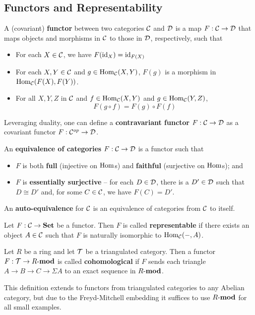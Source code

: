 \documentclass[12pt]{article}
\begin{document}
\subsection{Functors and Representability}
\begin{defn}
  A (covariant) \textbf{functor} between two categories $\mathcal{C}$ and $\mathcal{D}$ is a map $F:\mathcal{C}\to\mathcal{D}$ that maps objects and morphisms in $\mathcal{C}$ to those in $\mathcal{D}$, respectively, such that 
  \begin{itemize}
    \item For each $X\in\mathcal{C}$, we have $F(\operatorname{id}_X)=\operatorname{id}_{F(X)}$
    \item For each $X,Y\in\mathcal{C}$ and $g\in\operatorname{Hom}_{\mathcal{C}}(X,Y)$, $F(g)$ is a morphism in $\operatorname{Hom}_{\mathcal{C}}(F(X),F(Y))$.
    \item For all $X,Y,Z$ in $\mathcal{C}$ and $f\in\operatorname{Hom}_{\mathcal{C}}(X,Y)$ and $g\in\operatorname{Hom}_{\mathcal{C}}(Y,Z)$,
    \[F(g\circ f)=F(g)\circ F(f)\]
  \end{itemize}
\end{defn}
\begin{rmk}
	Leveraging duality, one can define a \textbf{contravariant functor} $F:\mathcal{C}\to \mathcal{D}$ as a covariant functor $F:\mathcal{C}^{op}\to \mathcal{D}$.
\end{rmk}
\begin{defn}
	An \textbf{equivalence of categories} $F:\mathcal{C}\to\mathcal{D}$ is a functor such that 
	\begin{itemize}
		\item $F$ is both \textbf{full} (injective on $\operatorname{Hom}$s) and \textbf{faithful} (surjective on $\operatorname{Hom}$s); and 
		\item $F$ is \textbf{essentially surjective} -- for each $D\in\mathcal{D}$, there is a $D'\in\mathcal{D}$ such that 
		$D\cong D'$ and, for some $C\in\mathcal{C}$, we have $F(C)=D'$.
	\end{itemize}
	An \textbf{auto-equivalence} for $\mathcal{C}$ is an equivalence of categories from $\mathcal{C}$ to itself.
\end{defn}
\begin{defn}\label{def-rep-func}
	Let $F:\mathcal{C}\to \mathbf{Set}$ be a functor. Then $F$ is called \textbf{representable} if there exists an object $A\in \mathcal{C}$ such that
	$F$ is naturally isomorphic to $\operatorname{Hom}_{\mathcal{C}}(-,A)$.
\end{defn}
\begin{defn}\label{def-cohom-func}
	Let $R$ be a ring and let $\mathcal{T}$ be a triangulated category. Then a functor $F:\mathcal{T}\to R\text{-}\mathbf{mod}$ is called \textbf{cohomological}
	if $F$ sends each triangle $A\to B\to C\to\Sigma A$ to an exact sequence in $R\text{-}\mathbf{mod}$.
\end{defn}
\begin{rmk}
	This definition extends to functors from triangulated categories to any Abelian category, but due to the Freyd-Mitchell
	embedding it suffices to use $R\text{-}\mathbf{mod}$ for all small examples.
\end{rmk}
\end{document}
